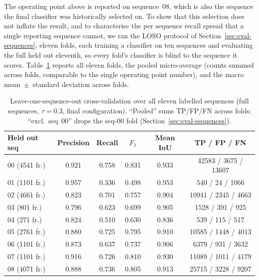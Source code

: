 \documentclass[a4paper,12pt]{report}
\begin{document}
The operating point above is reported on sequence~08, which is also the sequence
the final classifier was historically selected on. To show that this selection
does not inflate the result, and to characterise the per sequence recall spread
that a single reporting sequence cannot, we ran the LOSO protocol of
Section~\ref{sec:eval-sequences}: eleven folds, each training a classifier on ten
sequences and evaluating the full held out eleventh, so every fold's classifier
is blind to the sequence it scores. Table~\ref{tab:loso} reports all eleven folds,
the pooled micro-average (counts summed across folds, comparable to the single
operating point number), and the macro mean~$\pm$~standard deviation across folds.

\begin{table}[H]
  \centering
  \caption[Leave-one-sequence-out cross-validation]{Leave-one-sequence-out cross-validation
    over all eleven labelled sequences (full sequences, $\tau=0.3$, final configuration).
    ``Pooled'' sums TP/FP/FN across folds; ``excl.\ seq~00'' drops the seq-00 fold
    (Section~\ref{sec:eval-sequences}).}
  \label{tab:loso}
  \setlength{\tabcolsep}{3pt}
  \footnotesize
  \begin{tabular}{lccccc}
    \toprule
    Held out seq & Precision & Recall & $F_1$ & Mean IoU & TP / FP / FN \\
    \midrule
    00 (\num{4541} fr.) & 0.921 & 0.758 & 0.831 & 0.933 & \num{42583} / \num{3675} / \num{13607} \\
    01 (\num{1101} fr.) & 0.957 & 0.336 & 0.498 & 0.953 & \num{540} / \num{24} / \num{1066} \\
    02 (\num{4661} fr.) & 0.823 & 0.701 & 0.757 & 0.904 & \num{10941} / \num{2345} / \num{4663} \\
    03 (\num{801} fr.)  & 0.796 & 0.623 & 0.699 & 0.905 & \num{1528} / \num{391} / \num{925} \\
    04 (\num{271} fr.)  & 0.824 & 0.510 & 0.630 & 0.836 & \num{539} / \num{115} / \num{517} \\
    05 (\num{2761} fr.) & 0.880 & 0.725 & 0.795 & 0.910 & \num{10585} / \num{1448} / \num{4013} \\
    06 (\num{1101} fr.) & 0.873 & 0.637 & 0.737 & 0.906 & \num{6379} / \num{931} / \num{3632} \\
    07 (\num{1101} fr.) & 0.916 & 0.726 & 0.810 & 0.930 & \num{11089} / \num{1011} / \num{4179} \\
    08 (\num{4071} fr.) & 0.888 & 0.736 & 0.805 & 0.913 & \num{25715} / \num{3228} / \num{9207} \\

\end{tabular}
\end{table}
\end{document}
